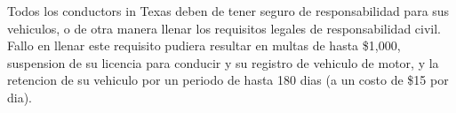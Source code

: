 \documentclass{article}
\begin{document}
\begin{tabularx}
Todos los conductors in Texas deben de tener seguro de \newline
responsabilidad para sus vehiculos, o de otra manera \newline
llenar los requisitos legales de responsabilidad civil. Fallo \newline
en llenar este requisito pudiera resultar en multas de hasta \newline
\$1,000, suspension de su licencia para conducir y su \newline
registro de vehiculo de motor, y la retencion de su vehiculo \newline
por un periodo de hasta 180 dias (a un costo de \$15 por \newline
dia). \\
\hline
\end{tabularx}
\end{document}
